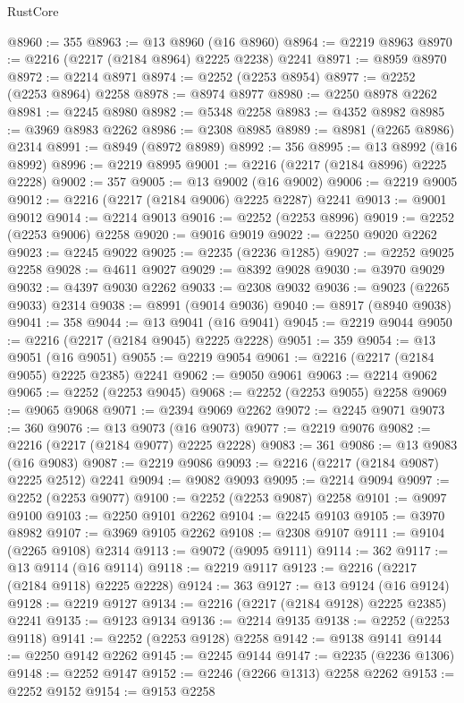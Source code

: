 \begin{lexlean}{RustCore}
\begin{coremodule}
@8960 := 355
@8963 := @13 @8960 (@16 @8960)
@8964 := @2219 @8963
@8970 := @2216 (@2217 (@2184 @8964) @2225 @2238) @2241
@8971 := @8959 @8970
@8972 := @2214 @8971
@8974 := @2252 (@2253 @8954)
@8977 := @2252 (@2253 @8964) @2258
@8978 := @8974 @8977
@8980 := @2250 @8978 @2262
@8981 := @2245 @8980
@8982 := @5348 @2258
@8983 := @4352 @8982
@8985 := @3969 @8983 @2262
@8986 := @2308 @8985
@8989 := @8981 (@2265 @8986) @2314
@8991 := @8949 (@8972 @8989)
@8992 := 356
@8995 := @13 @8992 (@16 @8992)
@8996 := @2219 @8995
@9001 := @2216 (@2217 (@2184 @8996) @2225 @2228)
@9002 := 357
@9005 := @13 @9002 (@16 @9002)
@9006 := @2219 @9005
@9012 := @2216 (@2217 (@2184 @9006) @2225 @2287) @2241
@9013 := @9001 @9012
@9014 := @2214 @9013
@9016 := @2252 (@2253 @8996)
@9019 := @2252 (@2253 @9006) @2258
@9020 := @9016 @9019
@9022 := @2250 @9020 @2262
@9023 := @2245 @9022
@9025 := @2235 (@2236 @1285)
@9027 := @2252 @9025 @2258
@9028 := @4611 @9027
@9029 := @8392 @9028
@9030 := @3970 @9029
@9032 := @4397 @9030 @2262
@9033 := @2308 @9032
@9036 := @9023 (@2265 @9033) @2314
@9038 := @8991 (@9014 @9036)
@9040 := @8917 (@8940 @9038)
@9041 := 358
@9044 := @13 @9041 (@16 @9041)
@9045 := @2219 @9044
@9050 := @2216 (@2217 (@2184 @9045) @2225 @2228)
@9051 := 359
@9054 := @13 @9051 (@16 @9051)
@9055 := @2219 @9054
@9061 := @2216 (@2217 (@2184 @9055) @2225 @2385) @2241
@9062 := @9050 @9061
@9063 := @2214 @9062
@9065 := @2252 (@2253 @9045)
@9068 := @2252 (@2253 @9055) @2258
@9069 := @9065 @9068
@9071 := @2394 @9069 @2262
@9072 := @2245 @9071
@9073 := 360
@9076 := @13 @9073 (@16 @9073)
@9077 := @2219 @9076
@9082 := @2216 (@2217 (@2184 @9077) @2225 @2228)
@9083 := 361
@9086 := @13 @9083 (@16 @9083)
@9087 := @2219 @9086
@9093 := @2216 (@2217 (@2184 @9087) @2225 @2512) @2241
@9094 := @9082 @9093
@9095 := @2214 @9094
@9097 := @2252 (@2253 @9077)
@9100 := @2252 (@2253 @9087) @2258
@9101 := @9097 @9100
@9103 := @2250 @9101 @2262
@9104 := @2245 @9103
@9105 := @3970 @8982
@9107 := @3969 @9105 @2262
@9108 := @2308 @9107
@9111 := @9104 (@2265 @9108) @2314
@9113 := @9072 (@9095 @9111)
@9114 := 362
@9117 := @13 @9114 (@16 @9114)
@9118 := @2219 @9117
@9123 := @2216 (@2217 (@2184 @9118) @2225 @2228)
@9124 := 363
@9127 := @13 @9124 (@16 @9124)
@9128 := @2219 @9127
@9134 := @2216 (@2217 (@2184 @9128) @2225 @2385) @2241
@9135 := @9123 @9134
@9136 := @2214 @9135
@9138 := @2252 (@2253 @9118)
@9141 := @2252 (@2253 @9128) @2258
@9142 := @9138 @9141
@9144 := @2250 @9142 @2262
@9145 := @2245 @9144
@9147 := @2235 (@2236 @1306)
@9148 := @2252 @9147
@9152 := @2246 (@2266 @1313) @2258 @2262
@9153 := @2252 @9152
@9154 := @9153 @2258

\end{coremodule}
\end{lexlean}
